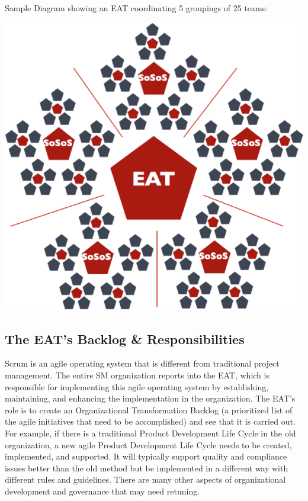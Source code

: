 \documentclass[12pt,a4paper,parskip=full]{scrartcl}
\begin{document}
\pagebreak
Sample Diagram showing an EAT coordinating 5 groupings of 25 teams:

\includegraphics[width=1.0\linewidth]{SoS-EAT.png}

\subsection{The EAT's Backlog \& Responsibilities}
Scrum is an agile operating system that is different from traditional
project management. The entire SM organization reports into the EAT, which
is responsible for implementing this agile operating system by
establishing, maintaining, and enhancing the implementation in the
organization.
The EAT's role is to create an Organizational Transformation Backlog (a
prioritized list of the agile initiatives that need to be accomplished) and
see that it is carried out. For example, if there is a traditional Product
Development Life Cycle in the old organization, a new agile Product
Development Life Cycle needs to be created, implemented, and supported. It
will typically support quality and compliance issues better than the old
method but be implemented in a different way with different rules and
guidelines. There are many other aspects of organizational development and
governance that may need retuning.
\end{document}
